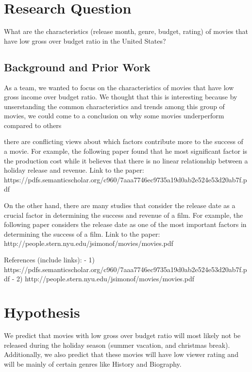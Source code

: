 \documentclass[11pt]{article}
\begin{document}
    \section{Research Question}\label{research-question}

What are the characteristics (release month, genre, budget, rating) of
movies that have low gross over budget ratio in the United States?

    \subsection{Background and Prior Work}\label{background-and-prior-work}

    As a team, we wanted to focus on the characteristics of movies that have
low gross income over budget ratio. We thought that this is interesting
because by unserstanding the common characteristics and trends among
this group of movies, we could come to a conclusion on why some movies
underperform compared to others

there are conflicting views about which factors contribute more to the
success of a movie. For example, the following paper found that he most
significant factor is the production cost while it believes that there
is no linear relationship between a holiday release and revenue. Link to
the paper:
https://pdfs.semanticscholar.org/c960/7aaa7746ec9735a19d0ab2e524e53d20ab7f.pdf

On the other hand, there are many studies that consider the release date
as a crucial factor in determining the success and revenue of a film.
For example, the following paper considers the release date as one of
the most important factors in determining the success of a film. Link to
the paper: http://people.stern.nyu.edu/jsimonof/movies/movies.pdf

References (include links): - 1)
https://pdfs.semanticscholar.org/c960/7aaa7746ec9735a19d0ab2e524e53d20ab7f.pdf
- 2) http://people.stern.nyu.edu/jsimonof/movies/movies.pdf

    \section{Hypothesis}\label{hypothesis}

We predict that movies with low gross over budget ratio will most likely
not be released during the holiday season (summer vacation, and
christmas break). Additionally, we also predict that these movies will
have low viewer rating and will be mainly of certain genres like History
and Biography.
\end{document}
